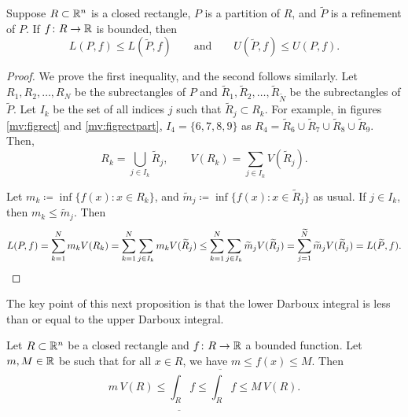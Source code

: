 \begin{prop} \label{mv:prop:refinement}
Suppose $R \subset {\mathbb{R}}^n$ is a closed rectangle, $P$ is a partition of $R$,
and $\widetilde{P}$ is a refinement of $P$.
If $f \colon R \to {\mathbb{R}}$ is bounded,
then
\begin{equation*}
L(P,f) \leq L(\widetilde{P},f) 
\qquad \text{and} \qquad
U(\widetilde{P},f) \leq U(P,f) .
\end{equation*}
\end{prop}

\begin{proof}
We prove the first inequality, and the second follows similarly.
Let $R_1,R_2,\ldots,R_N$ be the subrectangles of $P$
and
$\widetilde{R}_1,\widetilde{R}_2,\ldots,\widetilde{R}_{\widetilde{N}}$ be the
subrectangles of
$\widetilde{P}$.
Let $I_k$ be the set of all indices $j$ such that $\widetilde{R}_j \subset R_k$.
For example, in figures \ref{mv:figrect} and
\ref{mv:figrectpart}, $I_4 = \{ 6, 7, 8, 9 \}$ as
$R_4 =
\widetilde{R}_6 \cup \widetilde{R}_7 \cup
\widetilde{R}_8 \cup \widetilde{R}_9$.
Then,
\begin{equation*}
R_k = \bigcup_{j \in I_k} \widetilde{R}_j,
\qquad
V(R_k) = \sum_{j \in I_k} V(\widetilde{R}_j).
\end{equation*}

Let $m_k \coloneqq \inf \bigl\{ f(x) : x \in R_k \bigr\}$, and
$\widetilde{m}_j \coloneqq \inf \bigl\{ f(x) : x \in \widetilde{R}_j \bigr\}$ as usual.
If $j \in I_k$, then $m_k \leq \widetilde{m}_j$.  Then
\begin{equation*}
L(P,f)
=
\sum_{k=1}^N m_k V(R_k)
=
\sum_{k=1}^N \sum_{j\in I_k} m_k V(\widetilde{R}_j)
\leq
\sum_{k=1}^N \sum_{j\in I_k} \widetilde{m}_j V(\widetilde{R}_j)
=
\sum_{j=1}^{\widetilde{N}} \widetilde{m}_j V(\widetilde{R}_j) = L(\widetilde{P},f) .
\qedhere
\end{equation*}
\end{proof}

The key point of this next proposition is that
the lower Darboux integral is less than or equal to the upper Darboux
integral.

\begin{prop} \label{mv:intulbound:prop}
Let $R \subset {\mathbb{R}}^n$ be a closed rectangle and
$f \colon R \to {\mathbb{R}}$ a bounded function.  Let $m, M \in {\mathbb{R}}$ be 
such that for all $x \in R$, we have $m \leq f(x) \leq M$.  Then
\begin{equation}
\label{mv:intulbound:eq}
m \, V(R) \leq
\underline{\int_R} f \leq \overline{\int_R} f
\leq M \, V(R).
\end{equation}
\end{prop}

